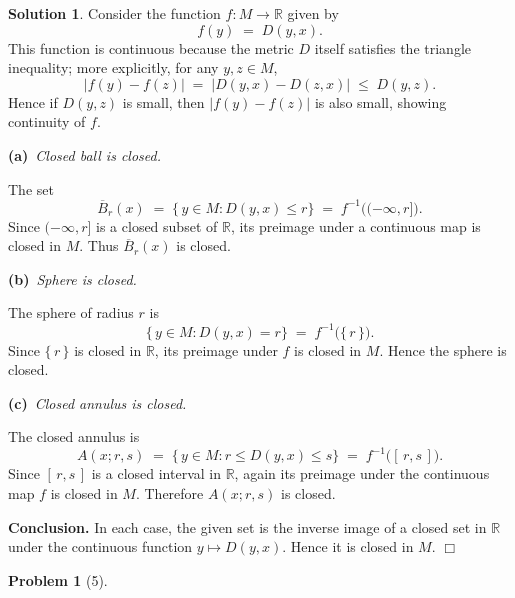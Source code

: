 \documentclass[12pt]{article}
\theoremstyle{definition} %
\newtheorem{solution}{Solution}
\newtheorem{problem}{Problem}
\theoremstyle{plain} %
\begin{document}
\begin{solution}
    \smallskip
    \noindent
    Consider the function $f : M \to \mathbb{R}$ given by 
    \[
    f(y) \;=\; D(y,x).
    \]
    This function is continuous because the metric $D$ itself satisfies the triangle inequality; more explicitly, for any $y,z \in M$,
    \[
    |f(y) - f(z)| \;=\; \bigl|D(y,x) - D(z,x)\bigr|
    \;\le\; D(y,z).
    \]
    Hence if $D(y,z)$ is small, then $|f(y)-f(z)|$ is also small, showing continuity of $f$.
    
    \bigskip
    \noindent
    \textbf{(a)}~\emph{Closed ball is closed.}
    
    \smallskip
    \noindent
    The set
    \[
    \overline{B}_r(x)
    \;=\;
    \{\,y \in M : D(y,x) \le r\}
    \;=\;
    f^{-1}\bigl((-\infty,r]\bigr).
    \]
    Since $(-\infty,r]$ is a closed subset of $\mathbb{R}$, its preimage under a continuous map is closed in $M$. Thus $\overline{B}_r(x)$ is closed.
    
    \bigskip
    \noindent
    \textbf{(b)}~\emph{Sphere is closed.}
    
    \smallskip
    \noindent
    The sphere of radius $r$ is
    \[
    \{\,y \in M : D(y,x) = r\}
    \;=\;
    f^{-1}\bigl(\{\,r\,\}\bigr).
    \]
    Since $\{\,r\,\}$ is closed in $\mathbb{R}$, its preimage under $f$ is closed in $M$. Hence the sphere is closed.
    
    \bigskip
    \noindent
    \textbf{(c)}~\emph{Closed annulus is closed.}
    
    \smallskip
    \noindent
    The closed annulus is
    \[
    A(x;r,s)
    \;=\;
    \{\,y \in M : r \le D(y,x) \le s\}
    \;=\;
    f^{-1}\bigl([\,r,s\,]\bigr).
    \]
    Since $[\,r,s\,]$ is a closed interval in $\mathbb{R}$, again its preimage under the continuous map $f$ is closed in $M$. Therefore $A(x;r,s)$ is closed.
    
    \bigskip
    \noindent
    \textbf{Conclusion.} In each case, the given set is the inverse image of a closed set in $\mathbb{R}$ under the continuous function $y \mapsto D(y,x)$. Hence it is closed in $M$. \quad $\Box$     
\end{solution}
\begin{problem}[5]
    
\end{problem}
\end{document}
